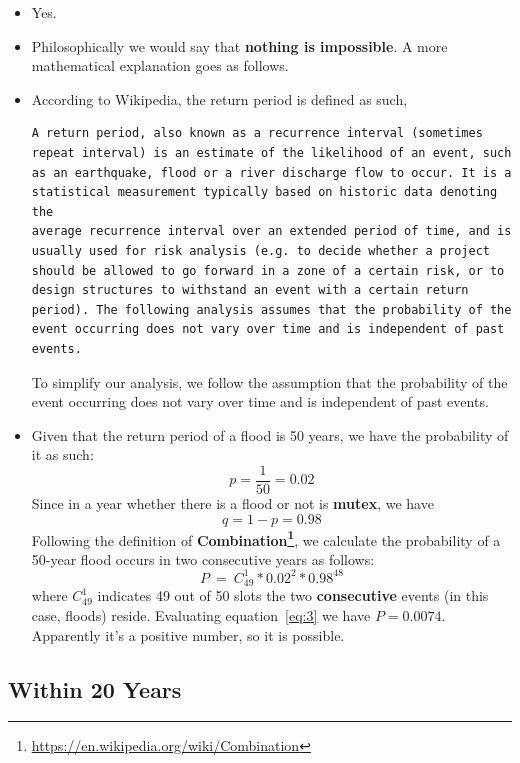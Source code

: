\documentclass[12pt]{article}
\begin{document}
\begin{itemize}
\item Yes.
\item Philosophically we would say that \textbf{nothing is
    impossible}. A more mathematical explanation goes as follows.
\item According to Wikipedia, the return period is defined as such,
\begin{verbatim}
A return period, also known as a recurrence interval (sometimes 
repeat interval) is an estimate of the likelihood of an event, such 
as an earthquake, flood or a river discharge flow to occur. It is a
statistical measurement typically based on historic data denoting the
average recurrence interval over an extended period of time, and is
usually used for risk analysis (e.g. to decide whether a project
should be allowed to go forward in a zone of a certain risk, or to
design structures to withstand an event with a certain return
period). The following analysis assumes that the probability of the
event occurring does not vary over time and is independent of past
events. 
\end{verbatim}
  To simplify our analysis, we follow the assumption that the
  probability of the event occurring does not vary over time and is
  independent of past events.
\item Given that the return period of a flood is 50 years, we have the
  probability of it as such:
  \begin{equation}
    \label{eq:1}
    p=\frac{1}{50}=0.02
  \end{equation}
  Since in a year whether there is a flood or not is \textbf{mutex},
  we have 
  \begin{equation}
    \label{eq:2}
    q = 1-p = 0.98
  \end{equation}
  Following the definition of
  \textbf{Combination\footnote{\url{https://en.wikipedia.org/wiki/Combination}}},
  we calculate the probability of a 50-year flood occurs in two
  consecutive years as follows:
  \begin{equation}
    \label{eq:3}
    P~=~C^{1}_{49}*0.02^{2}*0.98^{48}
  \end{equation}
  where $C^{1}_{49}$ indicates 49 out of 50 slots the two
  \textbf{consecutive} events (in this case, floods)
  reside. Evaluating equation~\eqref{eq:3} we have
  $P=0.0074$. Apparently it's a positive number, so it is possible.
\end{itemize}

\subsection{Within 20 Years}
\label{sec:within-20-years}
\end{document}
